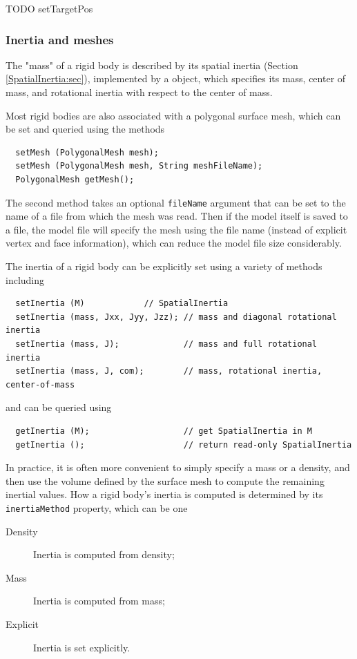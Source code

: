 TODO setTargetPos

\subsubsection{Inertia and meshes}

The "mass" of a rigid body is described by its spatial inertia
(Section \ref{SpatialInertia:sec}), implemented by a
 object, which
specifies its mass, center of mass, and rotational inertia with
respect to the center of mass.

Most rigid bodies are also associated with a polygonal surface mesh,
which can be set and queried using the methods
%
\begin{lstlisting}
  setMesh (PolygonalMesh mesh);
  setMesh (PolygonalMesh mesh, String meshFileName);
  PolygonalMesh getMesh();
\end{lstlisting}
%
The second method takes an optional {\tt fileName} argument that can
be set to the name of a file from which the mesh was read. Then if the
model itself is saved to a file, the model file will specify the mesh
using the file name (instead of explicit vertex and face information),
which can reduce the model file size considerably.

The inertia of a rigid body can be explicitly set using a variety
of methods including
%
\begin{lstlisting}
  setInertia (M)		    // SpatialInertia
  setInertia (mass, Jxx, Jyy, Jzz); // mass and diagonal rotational inertia
  setInertia (mass, J);             // mass and full rotational inertia
  setInertia (mass, J, com);        // mass, rotational inertia, center-of-mass
\end{lstlisting}
%
and can be queried using 
%
\begin{lstlisting}
  getInertia (M);                   // get SpatialInertia in M
  getInertia ();                    // return read-only SpatialInertia
\end{lstlisting}
%

In practice, it is often more convenient to simply specify a mass or a
density, and then use the volume defined by the surface mesh to
compute the remaining inertial values. How a rigid body's inertia is
computed is determined by its {\tt inertiaMethod} property, which can
be one

\begin{description}

\item[Density]\mbox{}

Inertia is computed from density;

\item[Mass]\mbox{}

Inertia is computed from mass;

\item[Explicit]

Inertia is set explicitly.

\end{description}

